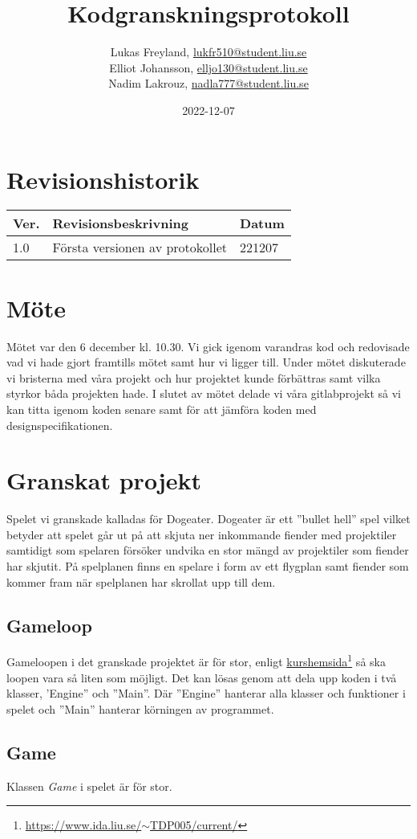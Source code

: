 \documentclass[12pt]{TDP005mall}
\author{Lukas Freyland, \url{lukfr510@student.liu.se}\\
  Elliot Johansson, \url{elljo130@student.liu.se}\\
  Nadim Lakrouz, \url{nadla777@student.liu.se}}
\title{Kodgranskningsprotokoll}
\date{2022-12-07}
\begin{document}
\projectpage
\section{Revisionshistorik}
\begin{table}[!h]
\begin{tabularx}{\linewidth}{|l|X|l|}
\hline
Ver. & Revisionsbeskrivning & Datum \\\hline
1.0 & Första versionen av protokollet & 221207 \\\hline
\end{tabularx}
\end{table}


\section{Möte}
Mötet var den 6 december kl. 10.30. Vi gick igenom varandras kod och redovisade vad vi hade gjort framtills mötet samt hur vi ligger till. Under mötet diskuterade vi bristerna med våra projekt och hur projektet kunde förbättras samt vilka styrkor båda projekten hade. I slutet av mötet delade vi våra gitlabprojekt så vi kan titta igenom koden senare samt för att jämföra koden med designspecifikationen.

\section{Granskat projekt}
Spelet vi granskade kalladas för Dogeater. Dogeater är ett ''bullet hell'' spel vilket betyder att spelet går ut på att skjuta ner inkommande fiender med projektiler samtidigt som spelaren försöker undvika en stor mängd av projektiler som fiender har skjutit. På spelplanen finns en spelare i form av ett flygplan samt fiender som kommer fram när spelplanen har skrollat upp till dem. 

\subsection{Gameloop}
Gameloopen i det granskade projektet är för stor, enligt \href{https://www.ida.liu.se/~TDP005/current/}{kurshemsida}\footnote{\href{https://www.ida.liu.se/~TDP005/current/}{https://www.ida.liu.se/\(\sim\)TDP005/current/}} så ska loopen vara så liten som möjligt. Det kan lösas genom att dela upp koden i två klasser, 'Engine'' och ''Main''. Där ''Engine'' hanterar alla klasser och funktioner i spelet och ''Main'' hanterar körningen av programmet. 

\subsection{Game}
Klassen \textit{Game} i spelet är för stor. 
\end{document}
